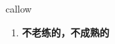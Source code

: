 
\begin{frame}
{\huge callow}
\begin{center}
\begin{enumerate}\Large
  \item \textbf{不老练的，不成熟的}
\end{enumerate}
\end{center}
\end{frame}
